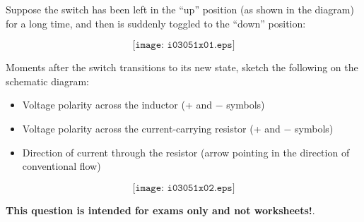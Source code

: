 

Suppose the switch has been left in the ``up'' position (as shown in the diagram) for a long time, and then is suddenly toggled to the ``down'' position:

$$\texttt{[image: i03051x01.eps]}$$

Moments after the switch transitions to its new state, sketch the following on the schematic diagram:

\begin{itemize}
\item{} Voltage polarity across the inductor (+ and $-$ symbols)
\vskip 5pt
\item{} Voltage polarity across the current-carrying resistor (+ and $-$ symbols)
\vskip 5pt
\item{} Direction of current through the resistor (arrow pointing in the direction of conventional flow)
\end{itemize}







$$\texttt{[image: i03051x02.eps]}$$







{\bf This question is intended for exams only and not worksheets!}.


